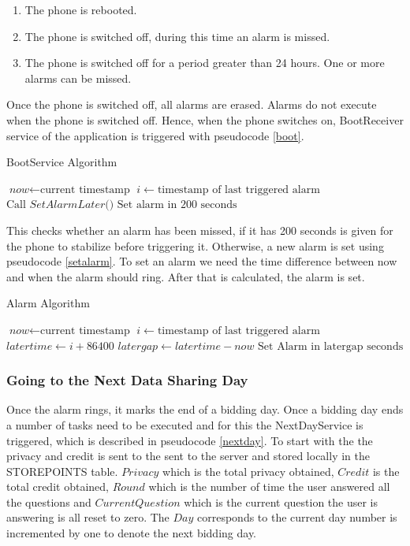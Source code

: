 \begin{enumerate}
	\item The phone is rebooted.
	\item The phone is switched off, during this time an alarm is missed.
    \item The phone is switched off for a period greater than 24 hours. One or more alarms can be missed.
\end{enumerate}

Once the phone is switched off, all alarms are erased. Alarms do not execute when the phone is switched off. Hence, when the phone switches on,
BootReceiver service of the application is triggered with pseudocode \ref{boot}.

\begin{algorithm}
\caption{BootService Algorithm}\label{boot}
\begin{algorithmic}[1]
\State $\textit{now} \gets \text{current timestamp}$
\State $i \gets \text{timestamp of last triggered alarm}$
  \State $\text{Call }\textit{SetAlarmLater()}$
\Else
  \State $\text{Set alarm in 200 seconds}$
\EndIf
\EndProcedure
\end{algorithmic}
\end{algorithm}

This checks whether an alarm has been missed, if it has 200 seconds is given for the phone to stabilize before triggering it. Otherwise, a new alarm is set using pseudocode \ref{setalarm}. To set an alarm we need the time difference between now and when the alarm should ring. After that is calculated, the alarm is set.

\begin{algorithm}
\caption{Alarm Algorithm}\label{setalarm}
\begin{algorithmic}[1]
\State $\textit{now} \gets \text{current timestamp}$
\State $i \gets \text{timestamp of last triggered alarm}$
\State $\textit{latertime} \gets \textit{i}+\text{86400}$
\State $\textit{latergap} \gets \textit{latertime}-\textit{now}$
\State $\text{Set Alarm in latergap seconds}$
\EndProcedure
\end{algorithmic}
\end{algorithm}

\subsubsection{Going to the Next Data Sharing Day} \label{next}
Once the alarm rings, it marks the end of a bidding day. Once a bidding day ends a number of tasks need to be executed
and for this the NextDayService is triggered, which is described in pseudocode \ref{nextday}. To start with the the privacy and credit is sent to
the sent to the server and stored locally in the STOREPOINTS table. $Privacy$ which is the total privacy obtained, $Credit$ is the total credit obtained, $Round$ which is the number of time the user answered all the questions and $CurrentQuestion$ which is the current question the user is answering is all reset to zero. The $Day$ corresponds to the current day number is incremented by one to denote the next bidding day.

